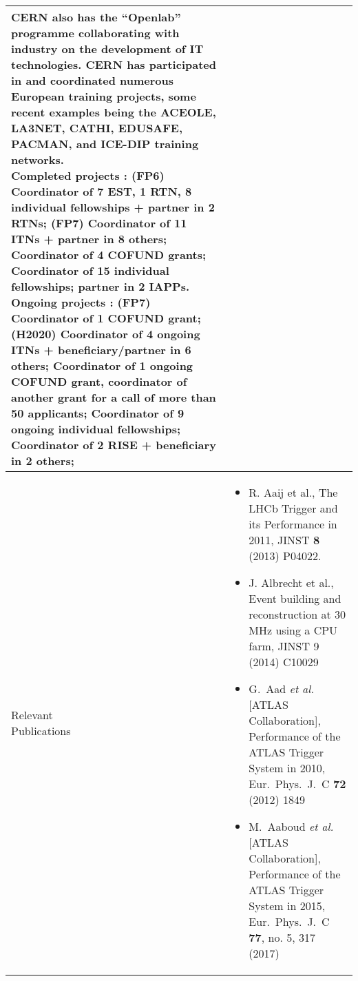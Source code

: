 \begin{center}
{\begin{tabular}{@{}p{25mm}|p{190mm}@{}}
{CERN also has the ``Openlab'' programme collaborating with industry on the development of IT technologies.
CERN has participated in and coordinated numerous European training projects, some recent examples being the ACEOLE, LA3NET, CATHI, EDUSAFE, PACMAN, and ICE-DIP training networks.\\
Completed projects : (FP6) Coordinator of 7 EST, 1 RTN, 8 individual fellowships + partner in 2 RTNs; (FP7) Coordinator of 11 ITNs + partner in 8 others; Coordinator of 4 COFUND grants; Coordinator of 15 individual fellowships; partner in 2 IAPPs. 
Ongoing projects : (FP7) Coordinator of 1 COFUND grant; (H2020) Coordinator of 4 ongoing ITNs + beneficiary/partner in 6 others; Coordinator of 1 ongoing COFUND grant, coordinator of another grant for a call of more than 50 applicants; Coordinator of 9 ongoing individual fellowships; Coordinator of 2 RISE + beneficiary in 2 others;
}\tabularnewline\hline
\pbox{8cm}{\Tstrut Relevant\\Publications} &%
{\vspace{-3mm}
\begin{itemize}%
\item R. Aaij et al., The LHCb Trigger and its Performance in 2011, JINST {\bf 8} (2013) P04022.
\item J. Albrecht et al., Event building and reconstruction at 30 MHz using a CPU farm, JINST 9 (2014) C10029
\item G.~Aad {\it et al.} [ATLAS Collaboration], Performance of the ATLAS Trigger System in 2010, Eur.\ Phys.\ J.\ C {\bf 72} (2012) 1849
\item M.~Aaboud {\it et al.} [ATLAS Collaboration], Performance of the ATLAS Trigger System in 2015, Eur.\ Phys.\ J.\ C {\bf 77}, no. 5, 317 (2017)
\vspace{-4mm}
\end{itemize}
}\tabularnewline\hline
\end{tabular}
}%
\end{center}